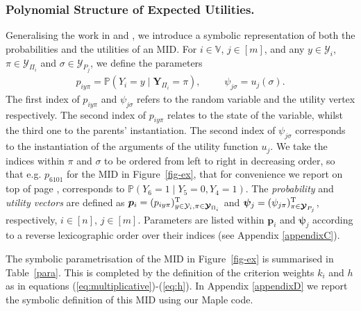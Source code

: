 \subsubsection{Polynomial Structure of Expected Utilities.}
\begin{figure}
\vspace{0.8cm}
\centerline{
}
\vspace{0.2cm}
\label{fig:riporto}
\end{figure}
Generalising the work in \citet{Darwiche2003} and \citet{Castillo1995}, we introduce a symbolic representation of both the probabilities and the utilities of an  MID. For $i\in \mathbb{V}$, $j\in[m]$, and any $y\in\mathcal{Y}_i$, $\pi\in\bm{\mathcal{Y}}_{\Pi_i}$ and  $\sigma\in \bm{\mathcal{Y}}_{P_j}$, we define the parameters
\[
\begin{array}{cccc}
p_{iy\pi}=\mathbb{P}(Y_i =y\; |\; \bm{Y}_{\Pi_i}=\pi), &&& \psi_{j\sigma}=u_j(\sigma).
\end{array}
\]
The first index of $p_{iy\pi}$ and $\psi_{j\sigma}$ refers to the random variable and the utility vertex respectively. The second index of $p_{iy\pi}$ relates to the state of the variable, whilst the third one to the parents' instantiation. The second index of $\psi_{j\sigma}$ corresponds to the instantiation of the arguments of the utility function $u_j$. We take the indices within $\pi$ and $\sigma$ to be ordered from left to right in decreasing order, so that e.g. $p_{6101}$ for the MID in Figure~\ref{fig-ex}, that for convenience we report on top of page \pageref{fig:riporto},  corresponds to $\mathbb{P}(Y_6=1\;|\; Y_5=0, Y_4=1)$. 
The \textit{probability} and \textit{utility vectors}  are defined as 
 $\bm{p}_i=(p_{iy\pi})^{\textnormal{T}}_{y\in\mathcal{Y}_i, \pi\in\bm{\mathcal{Y}}_{\Pi_i}}$ and $\bm{\psi}_j=(\psi_{j\pi})^{\textnormal{T}}_{\pi\in\bm{\mathcal{Y}}_{P_j}}$, respectively, $i\in[n]$, $j\in[m]$. Parameters are listed within $\bm{p}_i$ and $\bm{\psi}_j$ according to a reverse lexicographic order over their indices (see Appendix \ref{appendixC}).

\begin{example}
The symbolic parametrisation of the MID in Figure~\ref{fig-ex} is summarised in Table~\ref{para}. This is completed by the definition of the criterion weights $k_i$ and $h$ as in equations (\ref{eq:multiplicative})-(\ref{eq:h}). In Appendix \ref{appendixD} we report the symbolic definition of this MID using our Maple code.
\end{example}

